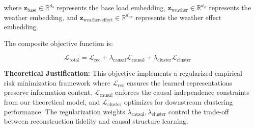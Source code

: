 \documentclass[journal]{IEEEtran}
\begin{document}
where $\mathbf{z}_{\text{base}} \in \mathbb{R}^{d_b}$ represents the base load embedding, $\mathbf{z}_{\text{weather}} \in \mathbb{R}^{d_w}$ represents the weather embedding, and $\mathbf{z}_{\text{weather-effect}} \in \mathbb{R}^{d_{we}}$ represents the weather effect embedding.

The composite objective function is:

\begin{equation}
\mathcal{L}_{\text{total}} = \mathcal{L}_{\text{rec}} + \lambda_{\text{causal}} \mathcal{L}_{\text{causal}} + \lambda_{\text{cluster}} \mathcal{L}_{\text{cluster}}
\label{eq:total_loss_causal}
\end{equation}

\textbf{Theoretical Justification:} This objective implements a regularized empirical risk minimization framework where $\mathcal{L}_{\text{rec}}$ ensures the learned representations preserve information content, $\mathcal{L}_{\text{causal}}$ enforces the causal independence constraints from our theoretical model, and $\mathcal{L}_{\text{cluster}}$ optimizes for downstream clustering performance. The regularization weights $\lambda_{\text{causal}}, \lambda_{\text{cluster}}$ control the trade-off between reconstruction fidelity and causal structure learning.
\end{document}
